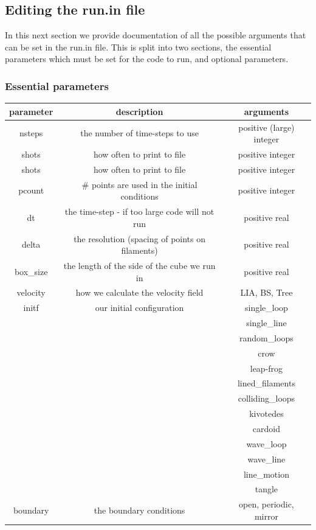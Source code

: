 \documentclass[12pt]{article}
\begin{document}
\subsection{Editing the run.in file}
In this next section we provide documentation of all the possible arguments that can be set in the run.in file.
This is split into two sections, the essential parameters which must be set for the code to run, and optional parameters. 
\subsubsection{Essential parameters}
\begin{center}
\begin{tabular}{|c|c|c|}
    \hline
parameter & description & arguments\\
    \hline
nsteps   & the number of time-steps to use & positive (large) integer \\
shots   & how often to print to file & positive integer \\
shots   & how often to print to file & positive integer \\
pcount   &  \# points are used in the initial conditions & positive integer \\ 
dt & the time-step - if too large code will not run & positive real  \\
delta & the resolution (spacing of points on filaments) & positive real \\
box\_size & the length of the side of the cube we run in & positive real \\
velocity & how we calculate the velocity field & LIA, BS, Tree \\
initf & our initial configuration & single\_loop \\
      &                           & single\_line \\
      &                           & random\_loops \\
      &                           & crow \\

      &                           & leap-frog \\
      &                           & lined\_filaments \\
      &                           & colliding\_loops \\
      &                           & kivotedes \\
      &                           & cardoid \\
      &                           & wave\_loop \\
      &                           & wave\_line \\
      &                           & line\_motion \\
      &                           & tangle \\
boundary & the boundary conditions & open, periodic, mirror\\
    \hline
\end{tabular}
\end{center}
\end{document}
